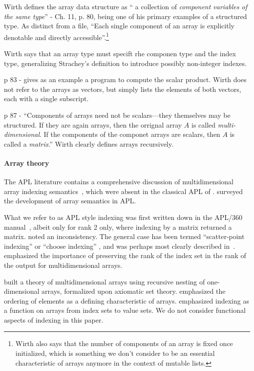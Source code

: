 Wirth defines the array data structure as `` a collection of \textit{component
variables of the same type}'' - Ch. 11, p. 80, being one of his primary
examples of a structured type. As distinct from a file, ``Each single component
of an array is explicitly denotable and directly accessible''.\footnote{Wirth
also says that the number of
components of an array is fixed once initialized, which is something we don't
consider to be an essential characteristic of arrays anymore in the context of
mutable lists.}

Wirth says that an array type must specift rhe componen type and the index type,
generalizing Strachey's definition to introduce possibly non-integer indexes.

p 83 - gives as an example a program to compute the scalar product.
Wirth does not refer to the arrays as vectors, but simply lists the elements of
both vectors, each with a single subscript.

p 87 - ``Components of arrays need not be scalars---they themselves may be structured.
If they are again arrays, then the orrignal array $A$ is called \textit{multi-dimensional}.
If the components of the componet arrays are scalars, then
$A$ is called a \textit{matrix}.'' Wirth clearly defines arrays recursively.


\paragraph{Array theory} The APL literature contains a comprehensive discussion
of multidimensional array indexing semantics~\cite{Brown1982}, which were
absent in the classical APL of \cite{Iverson1962}. \cite{Ruehr1982,Gerth1988}
surveyed the development of array semantics in APL.

What we refer to as APL style indexing was first written down in the APL/360
manual~\cite{Falkoff1968}, albeit only for rank 2 only, where indexing by a
matrix returned a matrix. \cite{Haegi1976} noted an inconsistency. The general
case has been termed ``scatter-point indexing'' or ``choose indexing''
\cite{Brown1972,Ruehr1982}, and was perhaps most clearly described
in~\cite{More1979}. \cite{Gull1979} emphasized the importance of preserving
the rank of the index set in the rank of the output for multidimensional
arrays.

\cite{More1973} built a theory of multidimensional arrays using recursive
nesting of one-dimensional arrays, formalized upon axiomatic set theory.
\cite{Ghandour1973} emphasized the ordering of elements as a defining
characteristic of arrays. \cite{Gerth1988} emphasized indexing as a function on
arrays from index sets to value sets. We do not consider functional aspects of
indexing in this paper.

